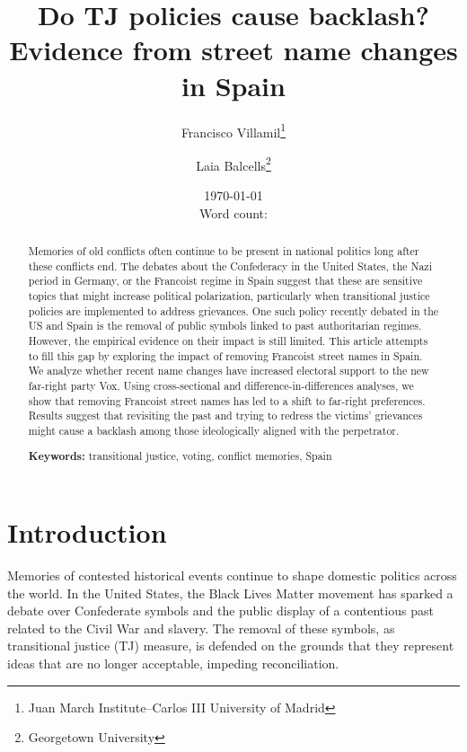 \documentclass[12pt, notitlepage]{article}
\title{\Large Do TJ policies cause backlash?\\Evidence from street name changes in Spain}
\author{Francisco Villamil\thanks{Juan March Institute--Carlos III University of Madrid} \and Laia Balcells\thanks{Georgetown University}}
\date{\today\\\vspace{5pt}Word count:}
\begin{document}
\maketitle

\begin{abstract}
Memories of old conflicts often continue to be present in national politics long after these conflicts end. The debates about the Confederacy in the United States, the Nazi period in Germany, or the Francoist regime in Spain suggest that these are sensitive topics that might increase political polarization, particularly when transitional justice policies are implemented to address grievances. One such policy recently debated in the US and Spain is the removal of public symbols linked to past authoritarian regimes. However, the empirical evidence on their impact is still limited. This article attempts to fill this gap by exploring the impact of removing Francoist street names in Spain. We analyze whether recent name changes have increased electoral support to the new far-right party Vox. Using cross-sectional and difference-in-differences analyses, we show that removing Francoist street names has led to a shift to far-right preferences. Results suggest that revisiting the past and trying to redress the victims' grievances might cause a backlash among those ideologically aligned with the perpetrator.

\vspace{5pt}
\noindent
\textbf{Keywords:} transitional justice, voting, conflict memories, Spain

\end{abstract}


\newpage
\section*{Introduction}

Memories of contested historical events continue to shape domestic politics across the world.
In the United States, the Black Lives Matter movement has sparked a debate over Confederate symbols and the public display of a contentious past related to the Civil War and slavery.
The removal of these symbols, as transitional justice (TJ) measure, is defended on the grounds that they represent ideas that are no longer acceptable, impeding reconciliation.
\end{document}
